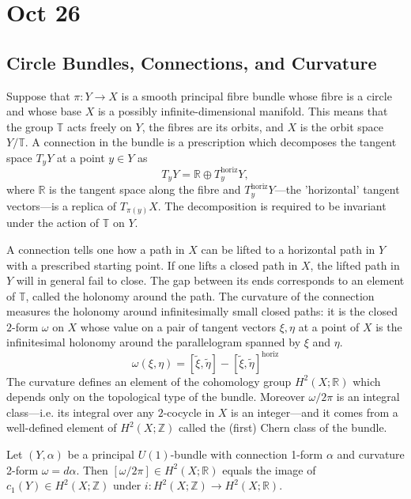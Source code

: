 \documentclass[12pt]{article}
\begin{document}
    \section{Oct 26}
\subsection{Circle Bundles, Connections, and Curvature}

Suppose that $\pi : Y \to X$ is a smooth principal fibre bundle whose fibre is a circle and whose base $X$ is a possibly infinite-dimensional manifold. This means that the group $\mathbb{T}$ acts freely on $Y$, the fibres are its orbits, and $X$ is the orbit space $Y / \mathbb{T}$. A connection in the bundle is a prescription which decomposes the tangent space $T_y Y$ at a point $y \in Y$ as
\[
T_y Y = \mathbb{R} \oplus T^{\mathrm{horiz}}_y Y,
\]
where $\mathbb{R}$ is the tangent space along the fibre and $T^{\mathrm{horiz}}_y Y$—the 'horizontal' tangent vectors—is a replica of $T_{\pi(y)}X$. The decomposition is required to be invariant under the action of $\mathbb{T}$ on $Y$.

A connection tells one how a path in $X$ can be lifted to a horizontal path in $Y$ with a prescribed starting point. If one lifts a closed path in $X$, the lifted path in $Y$ will in general fail to close. The gap between its ends corresponds to an element of $\mathbb{T}$, called the holonomy around the path. The curvature of the connection measures the holonomy around infinitesimally small closed paths: it is the closed $2$-form $\omega$ on $X$ whose value on a pair of tangent vectors $\xi, \eta$ at a point of $X$ is the infinitesimal holonomy around the parallelogram spanned by $\xi$ and $\eta$.
\[\omega(\xi, \eta)
= [\tilde{\xi}, \tilde{\eta}] - [\tilde{\xi}, \tilde{\eta}]^{\mathrm{horiz}}\]
The curvature defines an element of the cohomology group $H^2(X; \mathbb{R})$ which depends only on the topological type of the bundle. Moreover $\omega/2\pi$ is an integral class—i.e. its integral over any $2$-cocycle in $X$ is an integer—and it comes from a well-defined element of $H^2(X; \mathbb{Z})$ called the (first) Chern class of the bundle.

\begin{theorem}
    Let $(Y,\alpha)$ be a principal $U(1)$-bundle with connection 1-form $\alpha$ and curvature 2-form $\omega = d\alpha$. Then $[\omega / 2\pi] \in H^2(X;\mathbb{R})$ equals the image of $c_1(Y) \in H^2(X;\mathbb{Z})$ under $i: H^2(X;\mathbb{Z})\to H^2(X;\mathbb{R})$.
\end{theorem}
\end{document}
